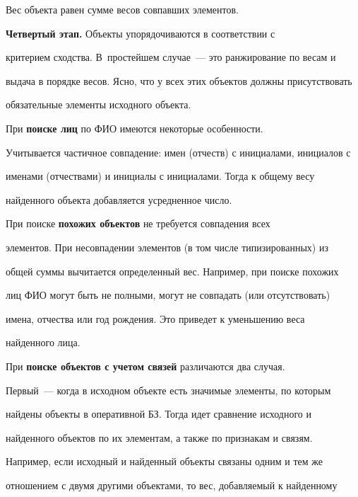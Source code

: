     


    Вес объекта равен сумме весов совпавших элементов.


    


    \textbf{Четвертый этап.} Объекты упорядочиваются в соответствии с 


критерием сходства. В~простейшем случае~--- это ранжирование по весам и 


выдача в порядке весов. Ясно, что у всех этих объектов должны присутствовать 


обязательные элементы исходного объекта. 


       


    


    При \textbf{поиске лиц} по ФИО имеются некоторые особенности. 


Учитывается частичное совпадение: имен (отчеств) с инициалами, инициалов с 


именами (отчествами) и инициалы с инициалами. Тогда к общему весу 


найденного объекта добавляется усредненное число.


    


    При поиске \textbf{похожих объектов} не требуется совпадения всех 


элементов. При несовпадении элементов (в том числе типизированных) из 


общей суммы вычитается определенный вес. Например, при поиске похожих 


лиц ФИО могут быть не полными, могут не совпадать (или отсутствовать) 


имена, отчества или год рождения. Это приведет к уменьшению веса 


найденного лица.


    


    При \textbf{поиске объектов с учетом связей} различаются два случая. 


Первый~--- когда в исходном объекте есть значимые элементы, по которым 


найдены объекты в оперативной БЗ. Тогда идет сравнение исходного и 


найденного объектов по их элементам, а также по признакам и связям. 


Например, если исходный и найденный объекты связаны одним и тем же 


отношением с двумя другими объектами, то вес, добавляемый к найденному 


